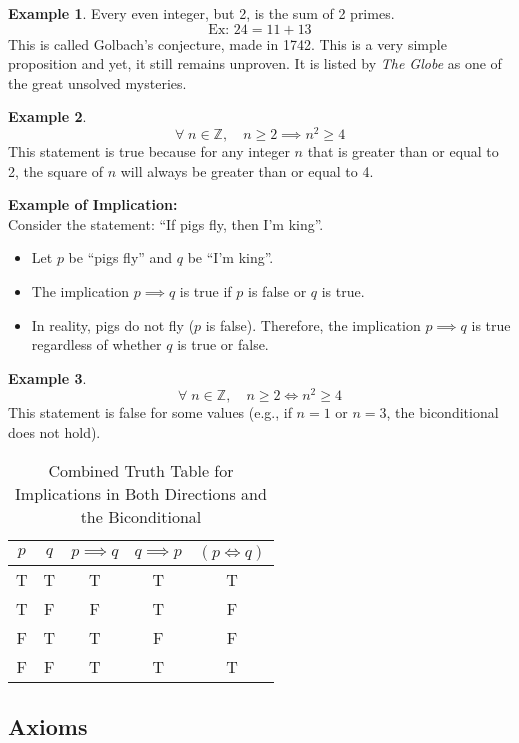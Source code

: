 \documentclass[11pt]{article}
\theoremstyle{definition}
\newtheorem{example}{Example}
\begin{document}
\begin{example}
Every even integer, but 2, is the sum of 2 primes.
\[
\text{Ex: } 24 = 11 + 13
\]
This is called Golbach's conjecture, made in 1742. This is a very simple proposition and yet, it still remains unproven. It is listed by \textit{The Globe} as one of the great unsolved mysteries.
\end{example}

\begin{example}
  \[
  \forall \; n \in \mathbb{Z},\quad n \geq 2 \implies n^2 \geq 4
  \]
  This statement is true because for any integer \( n \) that is greater than or equal to 2, the square of \( n \) will always be greater than or equal to 4.

  \textbf{Example of Implication:} \\
  Consider the statement: ``If pigs fly, then I'm king''.
  \begin{itemize}
  \item Let \(p\) be ``pigs fly'' and \(q\) be ``I'm king''.
  \item The implication \(p \implies q\) is true if \(p\) is false or \(q\) is true.
  \item In reality, pigs do not fly (\(p\) is false). Therefore, the implication \(p \implies q\) is true regardless of whether \(q\) is true or false.
  \end{itemize}
\end{example}

\begin{example}
\[
\forall \; n \in \mathbb{Z},\quad n \geq 2 \iff n^2 \geq 4
\]
This statement is false for some values (e.g., if \(n=1\) or \(n=3\), the biconditional does not hold).
\end{example}

\begin{table}[h!]
\centering
\begin{tabular}{ccccc}
\toprule
\(p\) & \(q\) & \(p \implies q\) & \(q \implies p\) & \((p \iff q)\) \\
\midrule
T & T & T & T & T \\
T & F & F & T & F \\
F & T & T & F & F \\
F & F & T & T & T \\
\bottomrule
\end{tabular}
\caption{Combined Truth Table for Implications in Both Directions and the Biconditional}
\end{table}

\subsection{Axioms}
\end{document}
